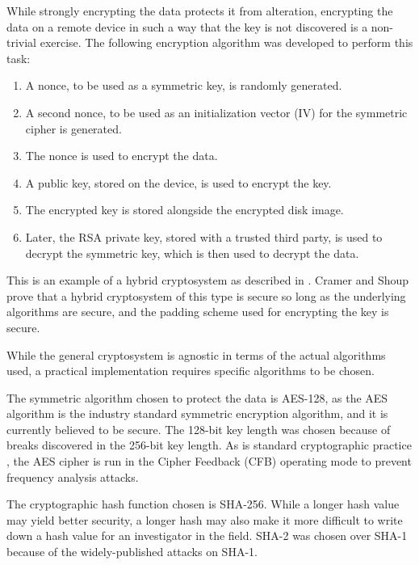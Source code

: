 
While strongly encrypting the data protects it from alteration, encrypting the data on a remote device in such
a way that the key is not discovered is a non-trivial exercise. The following encryption algorithm was developed
to perform this task:

\begin{enumerate}
  \item A nonce, to be used as a symmetric key, is randomly generated.
  \item A second nonce, to be used as an initialization vector (IV) for the symmetric cipher is generated.
  \item The nonce is used to encrypt the data.
  \item A public key, stored on the device, is used to encrypt the key.
  \item The encrypted key is stored alongside the encrypted disk image.
  \item Later, the RSA private key, stored with a trusted third party, is
        used to decrypt the symmetric key, which is then used to decrypt
        the data.
\end{enumerate}

This is an example of a hybrid cryptosystem as described in \cite{cramer2004}. Cramer and Shoup prove that a hybrid cryptosystem of
this type is secure so long as the underlying algorithms are secure, and the padding scheme used for encrypting the key is secure.


While the general cryptosystem is agnostic in terms of the actual algorithms used, a practical implementation requires specific
algorithms to be chosen.

The symmetric algorithm chosen to protect the data is AES-128, as the AES algorithm is the industry standard symmetric encryption
algorithm, and it is currently believed to be secure. The 128-bit key length was chosen because of breaks discovered in the 256-bit
key length\cite{Biryukov2009}. As is standard cryptographic practice \cite{NISTSP80038A}, the AES cipher is run in the Cipher Feedback (CFB)
operating mode to prevent frequency analysis attacks.

The cryptographic hash function chosen is SHA-256. While a longer hash value may yield better security, a longer hash may also make
it more difficult to write down a hash value for an investigator in the field. SHA-2 was chosen over SHA-1 because of the widely-published
attacks on SHA-1\cite{Manuel2011}.


